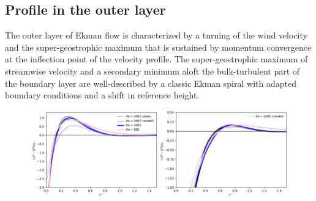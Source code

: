 \documentclass[a4paper,11pt]{amsart}
\begin{document}
\subsection{Profile in the outer layer}
%
The outer layer of Ekman flow is characterized by a turning of the wind velocity and the super-geostrophic maximum
that is sustained by momentum convergence at the inflection point of the velocity profile. 
The super-geostrophic maximum of streamwise velocity and a secondary minimum aloft the bulk-turbulent part of
the boundary layer are well-described by a classic Ekman spiral with adapted boundary conditions and a shift
in reference height.
%
\begin{figure}
  \includegraphics[width=0.5\textwidth]{../plot/outer_layer_u.pdf}\includegraphics[width=0.5\textwidth]{../plot/outer_layer_w.pdf}
  \caption{} 
\end{figure}
\end{document}
